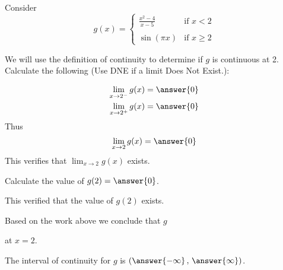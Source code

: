 \documentclass{ximera}
\author{Nela Lakos \and Kyle Parsons \and Bobby Ramsey}
\begin{document}
\begin{exercise}

Consider
\[
g(x) = 
\begin{cases}
\frac{x^2-4}{x-5} & \text{if }x<2\\ \\
\sin(\pi x) & \text{if }x\geq2
\end{cases}
\]

We will use the definition of continuity to determine if $g$ is continuous at 2.  Calculate the following (Use DNE if a limit Does Not Exist.): 


\begin{align*}
	\lim_{x\to2^-}g(x) &= \answer{0}\\
	\lim_{x\to2^+}g(x) &= \answer{0}
\end{align*}
Thus \[ \lim_{x\to2}g(x) = \answer{0} \]
This verifies that $\displaystyle \lim_{x\to 2} g(x)$ exists.

Calculate the value of $g(2)= \answer{0}$.

This verified that the value of $g(2)$ exists.

\begin{exercise}

Based on the work above we conclude that $g$
\begin{multipleChoice}
\end{multipleChoice}
at $x=2$.

\begin{exercise}

The interval of continuity for $g$ is $\left(\answer{-\infty}\, , \,\answer{\infty}\right)$.

\end{exercise}
\end{exercise}
\end{exercise}
\end{document}
